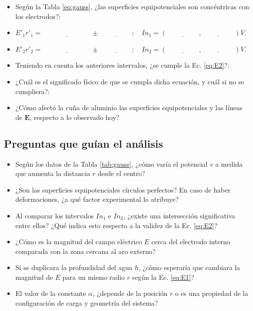 \begin{itemize}
    \item Según la Tabla \ref{eq:gauss}, ¿las superficies equipotenciales son concéntricas con los electrodos?: \hrulefill
    \item $E'_1 r'_1 = \underline{\hspace{3cm}} \pm \underline{\hspace{2cm}}; \quad In_1 = (\underline{\hspace{2cm}}, \underline{\hspace{2cm}}) V.$
    \item $E'_2 r'_2 = \underline{\hspace{3cm}} \pm \underline{\hspace{2cm}}; \quad In_2 = (\underline{\hspace{2cm}}, \underline{\hspace{2cm}}) V.$
    \item Teniendo en cuenta los anteriores intervalos, ¿se cumple la Ec. \eqref{eq:E2}?: \hrulefill
    \item ¿Cuál es el significado físico de que se cumpla dicha ecuación, y cuál si no se cumpliera?: \hrulefill
    \item  ¿Cómo afectó la cuña de aluminio las superficies equipotenciales y las líneas de $\mathbf{E}$, respecto a lo observado hoy? \hrulefill
\end{itemize}

\subsection{Preguntas que guían el análisis}

\begin{itemize}
    \item Según los datos de la Tabla \ref{tab:gauss}, ¿cómo varía el potencial $v$ a medida que aumenta la distancia $r$ desde el centro?
    
    \item ¿Son las superficies equipotenciales círculos perfectos? En caso de haber deformaciones, ¿a qué factor experimental lo atribuye?
    
    \item Al comparar los intervalos $In_1$ e $In_2$, ¿existe una intersección significativa entre ellos? ¿Qué indica esto respecto a la validez de la Ec. \eqref{eq:E2}?
    
    \item ¿Cómo es la magnitud del campo eléctrico $E$ cerca del electrodo interno comparada con la zona cercana al aro externo?
    
    \item Si se duplicara la profundidad del agua $h$, ¿cómo esperaría que cambiara la magnitud de $E$ para un mismo radio $r$ según la Ec. \eqref{eq:E1}?
    
    \item El valor de la constante $\alpha$, ¿depende de la posición $r$ o es una propiedad de la configuración de carga y geometría del sistema?
\end{itemize}

